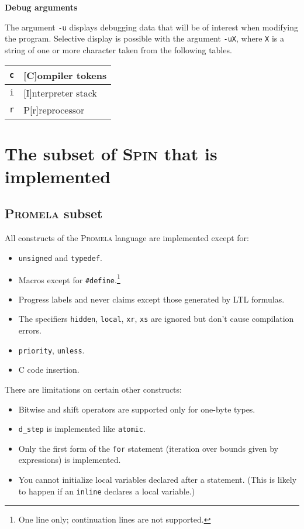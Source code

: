 \documentclass[11pt]{article}
\newcommand*{\spn}{\textsc{Spin}}
\newcommand*{\prm}{\textsc{Promela}}
\newcommand*{\p}[1]{\texttt{#1}}
\begin{document}
\medskip

\textbf{Debug arguments}

The argument \p{-u} displays debugging data that will be of interest
when modifying the program. Selective display is possible
with the argument \p{-uX}, where \p{X} is a string of one or more
character taken from the following tables.

\begin{center}
\begin{tabular}{|l|p{}|}
\hline
\p{c} & [C]ompiler tokens \\\hline
\p{i} & [I]nterpreter stack \\\hline
\p{r} & P[r]reprocessor\\\hline
\end{tabular}
\end{center}


\section{The subset of \spn{} that is implemented}
\subsection{\prm{} subset}

All constructs of the \prm{} language are implemented except for:
\begin{itemize}
\item \p{unsigned} and \p{typedef}.
\item Macros except for \p{\#define}.\footnote{One line only; continuation lines are
not supported.}
\item Progress labels and never claims except those generated by LTL formulas.
\item The specifiers \p{hidden}, \p{local}, \p{xr}, \p{xs} are
ignored but don't cause compilation errors.
\item \p{priority}, \p{unless}.
\item C code insertion.
\end{itemize}

There are limitations on certain other constructs:
\begin{itemize}
\item Bitwise and shift operators are supported only for one-byte types. 
\item \p{d\_step} is implemented like \p{atomic}.
\item Only the first form of the \p{for} statement (iteration over
bounds given by expressions) is implemented.
\item You cannot initialize local variables declared after a
statement. (This is likely to happen if an \p{inline} declares a
local variable.)
\end{itemize}
\end{document}
